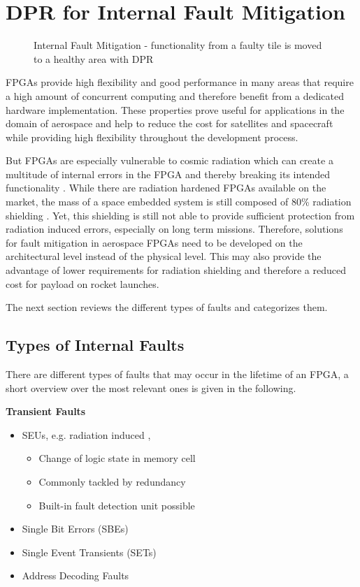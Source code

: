 \section{\gls{DPR} for Internal Fault Mitigation}\label{InternalFaults}
\begin{figure}
    \centering
    \resizebox{\smallColumnWidth}{!}{}
    \caption{Internal Fault Mitigation - functionality from a faulty tile is moved to a healthy area with \gls{DPR}}\label{fig:internalFaultMitigation}
\end{figure}

%
\glspl{FPGA} provide high flexibility and good performance in many areas that require a high amount of concurrent computing and therefore benefit from a dedicated hardware implementation.
These properties prove useful for applications in the domain of aerospace and help to reduce the cost for satellites and spacecraft while providing high flexibility throughout the development process. 

But \glspl{FPGA} are especially vulnerable to cosmic radiation which can create a multitude of internal errors in the \gls{FPGA} and thereby breaking its intended functionality \cite{ito_total_2015}.
While there are radiation hardened \glspl{FPGA} available on the market, the mass of a space embedded system is still composed of 80\% radiation shielding \cite{ito_total_2015}.
Yet, this shielding is still not able to provide sufficient protection from radiation induced errors, especially on long term missions. 
Therefore, solutions for fault mitigation in aerospace \glspl{FPGA} need to be developed on the architectural level instead of the physical level. 
This may also provide the advantage of lower requirements for radiation shielding and therefore a reduced cost for payload on rocket launches.

The next section reviews the different types of faults and categorizes them. 

\subsection{Types of Internal Faults}
There are different types of faults that may occur in the lifetime of an \gls{FPGA}, a short overview over the most relevant ones is given in the following.
\par
\textbf{Transient Faults}
\begin{itemize}
    \item \glspl{SEU}, e.g. radiation induced \cite{alkady_fault-tolerant_2014}, \cite{lee_fault-tolerant_2017}
    \begin{itemize}
    \item Change of logic state in memory cell
    \item Commonly tackled by redundancy
    \item Built-in fault detection unit possible
    \end{itemize}
    \item Single Bit Errors (SBEs)
    \item Single Event Transients (SETs)
    \item Address Decoding Faults
\end{itemize}

